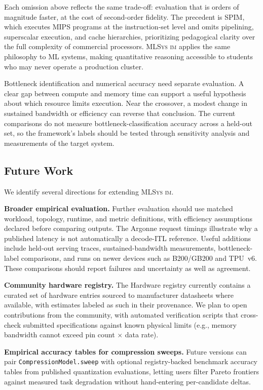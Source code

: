\documentclass[10pt,twocolumn]{article}
\newcommand{\mlsysim}{\mbox{\textsc{MLSys}\,\textperiodcentered\,\textsc{im}}\xspace}
\begin{document}
Each omission above reflects the same trade-off: evaluation that is orders of magnitude faster, at the cost of second-order fidelity. The precedent is SPIM, which executes MIPS programs at the instruction-set level and omits pipelining, superscalar execution, and cache hierarchies, prioritizing pedagogical clarity over the full complexity of commercial processors. \mlsysim applies the same philosophy to ML systems, making quantitative reasoning accessible to students who may never operate a production cluster.

Bottleneck identification and numerical accuracy need separate evaluation. A clear gap between compute and memory time can support a useful hypothesis about which resource limits execution. Near the crossover, a modest change in sustained bandwidth or efficiency can reverse that conclusion. The current comparisons do not measure bottleneck-classification accuracy across a held-out set, so the framework's labels should be tested through sensitivity analysis and measurements of the target system.

\subsection{Future Work}

We identify several directions for extending \mlsysim.

\textbf{Broader empirical evaluation.} Further evaluation should use matched workload, topology, runtime, and metric definitions, with efficiency assumptions declared before comparing outputs. The Argonne request timings illustrate why a published latency is not automatically a decode-ITL reference. Useful additions include held-out serving traces, sustained-bandwidth measurements, bottleneck-label comparisons, and runs on newer devices such as B200/GB200 and TPU~v6. These comparisons should report failures and uncertainty as well as agreement.

\textbf{Community hardware registry.} The Hardware registry currently contains a curated set of hardware entries sourced to manufacturer datasheets where available, with estimates labeled as such in their provenance. We plan to open contributions from the community, with automated verification scripts that cross-check submitted specifications against known physical limits (e.g., memory bandwidth cannot exceed pin count $\times$ data rate).

\textbf{Empirical accuracy tables for compression sweeps.} Future versions can pair \texttt{CompressionModel.sweep} with optional registry-backed benchmark accuracy tables from published quantization evaluations, letting users filter Pareto frontiers against measured task degradation without hand-entering per-candidate deltas.
\end{document}
